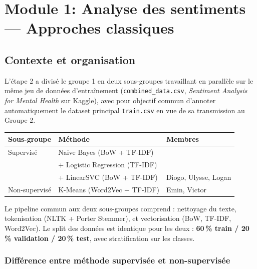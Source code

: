 \documentclass[12pt,a4paper]{report}
\begin{document}
\chapter{Module 1: Analyse des sentiments — Approches classiques}

\section{Contexte et organisation}

L'étape 2 a divisé le groupe 1 en deux sous-groupes travaillant en parallèle sur le même jeu de données d'entraînement (\texttt{combined\_data.csv}, \textit{Sentiment Analysis for Mental Health} sur Kaggle), avec pour objectif commun d'annoter automatiquement le dataset principal \texttt{train.csv} en vue de sa transmission au Groupe 2.

\begin{center}
\begin{tabular}{lll}
\toprule
\textbf{Sous-groupe} & \textbf{Méthode} & \textbf{Membres} \\
\midrule
Supervisé    & Naive Bayes (BoW + TF-IDF) & \\
             & + Logistic Regression (TF-IDF) &  \\
             & + LinearSVC (BoW + TF-IDF) & Diogo, Ulysse, Logan \\
\midrule
Non-supervisé & K-Means (Word2Vec + TF-IDF)                               & Emin, Victor \\
\bottomrule
\end{tabular}
\end{center}

Le pipeline commun aux deux sous-groupes comprend : nettoyage du texte, tokenisation (NLTK + Porter Stemmer), et vectorisation (BoW, TF-IDF, Word2Vec). Le split des données est identique pour les deux : \textbf{60\,\% train / 20\,\% validation / 20\,\% test}, avec stratification sur les classes.

\subsection{Différence entre méthode supervisée et non-supervisée}
\end{document}
